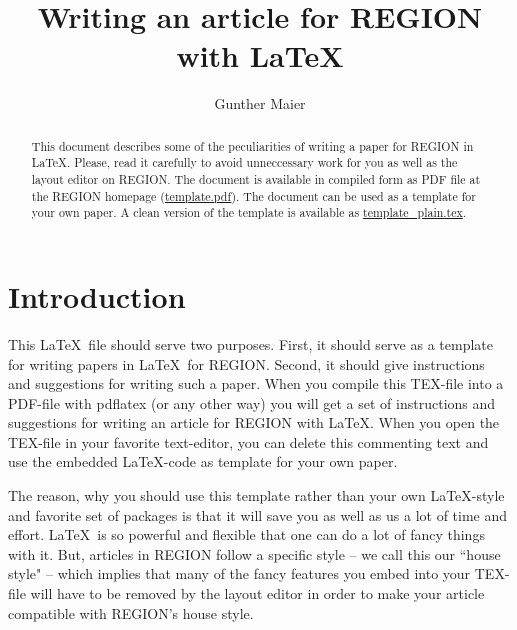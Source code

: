 \documentclass[a4paper,twoside]{article}
\title{Writing an article for REGION with \LaTeX}
\author{Gunther Maier}
\date{}
\begin{document}

\maketitle

\begin{abstract}
This document describes some of the peculiarities of writing a paper for REGION in \LaTeX. Please, read it carefully to avoid unneccessary work for you as well as the layout editor on REGION. The document is available in compiled form as PDF file at the REGION homepage (\href{template.pdf}{template.pdf}). The document can be used as a template for your own paper. A clean version of the template is available as \href{template\_plain.tex}{template\_plain.tex}.
\end{abstract}




\section{Introduction}
\label{sec:1}

This \LaTeX\ file should serve two purposes. First, it should serve as a template for writing papers in \LaTeX\ for REGION. Second, it should give instructions and suggestions for writing such a paper. When you compile this TEX-file into a PDF-file with pdflatex (or any other way) you will get a set of instructions and suggestions for writing an article for REGION with \LaTeX. When you open the TEX-file in your favorite text-editor, you can delete this commenting text and use the embedded \LaTeX-code as template for your own paper.

The reason, why you should use this template rather than your own \LaTeX-style and favorite set of packages is that it will save you as well as us a lot of time and effort. \LaTeX\ is so powerful and flexible that one can do a lot of fancy things with it. But, articles in REGION follow a specific style -- we call this our ``house style" -- which implies that many of the fancy features you embed into your TEX-file will have to be removed by the layout editor in order to make your article compatible with REGION's house style.
\end{document}

